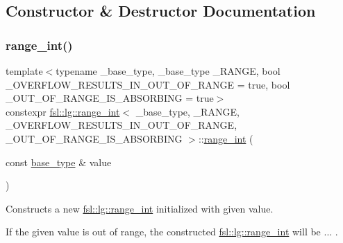 \subsection{Constructor \& Destructor Documentation}
\mbox{\label{classfsl_1_1lg_1_1range__int_a54f04ed17baa649329ea1f278f7f3020}} 
\subsubsection{\texorpdfstring{range\_int()}{range\_int()}}
{\footnotesize\ttfamily template$<$typename \+\_\+base\+\_\+type, \+\_\+base\+\_\+type \+\_\+\+R\+A\+N\+GE, bool \+\_\+\+O\+V\+E\+R\+F\+L\+O\+W\+\_\+\+R\+E\+S\+U\+L\+T\+S\+\_\+\+I\+N\+\_\+\+O\+U\+T\+\_\+\+O\+F\+\_\+\+R\+A\+N\+GE = true, bool \+\_\+\+O\+U\+T\+\_\+\+O\+F\+\_\+\+R\+A\+N\+G\+E\+\_\+\+I\+S\+\_\+\+A\+B\+S\+O\+R\+B\+I\+NG = true$>$ \\
constexpr \mbox{\hyperlink{classfsl_1_1lg_1_1range__int}{fsl\+::lg\+::range\+\_\+int}}$<$ \+\_\+base\+\_\+type, \+\_\+\+R\+A\+N\+GE, \+\_\+\+O\+V\+E\+R\+F\+L\+O\+W\+\_\+\+R\+E\+S\+U\+L\+T\+S\+\_\+\+I\+N\+\_\+\+O\+U\+T\+\_\+\+O\+F\+\_\+\+R\+A\+N\+GE, \+\_\+\+O\+U\+T\+\_\+\+O\+F\+\_\+\+R\+A\+N\+G\+E\+\_\+\+I\+S\+\_\+\+A\+B\+S\+O\+R\+B\+I\+NG $>$\+::\mbox{\hyperlink{classfsl_1_1lg_1_1range__int}{range\+\_\+int}} (\begin{DoxyParamCaption}\item[{const \mbox{\hyperlink{classfsl_1_1lg_1_1range__int_a4ce67cd216fd303b7bae83a7cbcab3bb}{base\+\_\+type}} \&}]{value }\end{DoxyParamCaption})\hspace{0.3cm}{\ttfamily [inline]}}



Constructs a new \mbox{\hyperlink{classfsl_1_1lg_1_1range__int}{fsl\+::lg\+::range\+\_\+int}} initialized with given value. 

If the given value is out of range, the constructed \mbox{\hyperlink{classfsl_1_1lg_1_1range__int}{fsl\+::lg\+::range\+\_\+int}} will be ... . 

